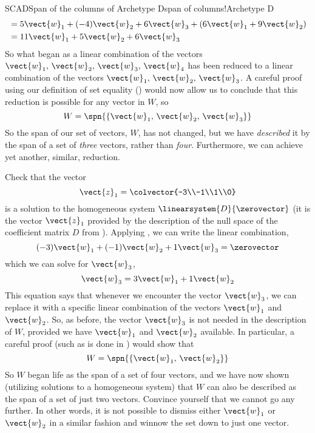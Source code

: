 \begin{example}{SCAD}{Span of the columns of Archetype D}{span of columns!Archetype D}
\begin{align*}
&=5\vect{w}_1+(-4)\vect{w}_2+6\vect{w}_3+\left(6\vect{w}_1+9\vect{w}_2\right)\\
&=11\vect{w}_1+5\vect{w}_2+6\vect{w}_3
\end{align*}
%
So what began as a linear combination of the vectors $\vect{w}_1,\,\vect{w}_2,\,\vect{w}_3,\,\vect{w}_4$ has been reduced to a linear combination of the vectors $\vect{w}_1,\,\vect{w}_2,\,\vect{w}_3$.  A careful proof using our definition of set equality () would now allow us to conclude that this reduction is possible for any vector in $W$, so
%
\begin{equation*}
W=\spn{\left\{\vect{w}_1,\,\vect{w}_2,\,\vect{w}_3\right\}}
\end{equation*}
%
So the span of our set of vectors, $W$, has not changed, but we have {\em described} it by the span of a set of {\em three} vectors, rather than {\em four}.  Furthermore, we can achieve yet another, similar, reduction.\par
%
Check that the vector
%
\begin{equation*}
\vect{z}_1=\colvector{-3\\-1\\1\\0}
\end{equation*}
%
is a solution to the homogeneous system $\linearsystem{D}{\zerovector}$ (it is the  vector $\vect{z}_1$ provided by the description of the null space of the coefficient matrix $D$ from ).  Applying , we can write the linear combination,
%
\begin{equation*}
(-3)\vect{w}_1+(-1)\vect{w}_2+1\vect{w}_3=\zerovector
\end{equation*}
%
which we can solve for $\vect{w}_3$,
%
\begin{equation*}
\vect{w}_3=3\vect{w}_1+1\vect{w}_2
\end{equation*}
%
This equation says that whenever we encounter the vector $\vect{w}_3$, we can replace it with a specific linear combination of the vectors $\vect{w}_1$ and $\vect{w}_2$.  So, as before, the vector $\vect{w}_3$ is not needed in the description of $W$, provided we have $\vect{w}_1$ and $\vect{w}_2$ available.  In particular, a careful proof (such as is done in ) would show that
%
\begin{equation*}
W=\spn{\left\{\vect{w}_1,\,\vect{w}_2\right\}}
\end{equation*}
%
So $W$ began life as the span of a set of four vectors, and we have now shown (utilizing solutions to a homogeneous system) that $W$ can also be described as the span of a set of just two vectors.  Convince yourself that we cannot go any further.  In other words, it is not possible to dismiss either $\vect{w}_1$ or $\vect{w}_2$ in a similar fashion and winnow the set down to just one vector.\par

\end{example}
